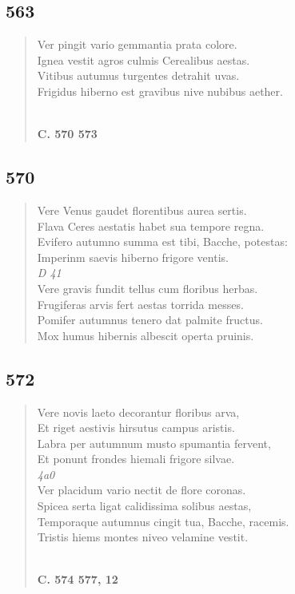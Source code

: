 \documentclass[11pt, a4paper]{report}
\begin{document}
            \subsection*{563}
      \begin{verse}
      Ver pingit vario gemmantia prata colore. \\ Ignea vestit agros culmis Cerealibus aestas. \\ Vitibus autumus turgentes detrahit uvas. \\ Frigidus hiberno est gravibus nive nubibus aether. \\ 
        ﻿\pagebreak 
    \begin{center} \textbf{C. 570 573} \end{center}
      \end{verse}
  
            \subsection*{570}
      \begin{verse}
      Vere Venus gaudet florentibus aurea sertis. \\ Flava Ceres aestatis habet sua tempore regna. \\ Evifero autumno summa est tibi, Bacche, potestas: \\ Imperinm saevis hiberno frigore ventis. \\ \textit{D 41} \\ Vere gravis fundit tellus cum floribus herbas. \\ Frugiferas arvis fert aestas torrida messes. \\ Pomifer autumnus tenero dat palmite fructus. \\ Mox humus hibernis albescit operta pruinis. \\ 
      \end{verse}
  
            \subsection*{572}
      \begin{verse}
      Vere novis laeto decorantur floribus arva, \\ Et riget aestivis hirsutus campus aristis. \\ Labra per autumnum musto spumantia fervent, \\ Et ponunt frondes hiemali frigore silvae. \\ \textit{4a0} \\ Ver placidum vario nectit de flore coronas. \\ Spicea serta ligat calidissima solibus aestas, \\ Temporaque autumnus cingit tua, Bacche, racemis. \\ Tristis hiems montes niveo velamine vestit. \\ 
        ﻿\pagebreak 
    \begin{center} \textbf{C. 574 577, 12} \end{center}
      \end{verse}
  
\end{document}
